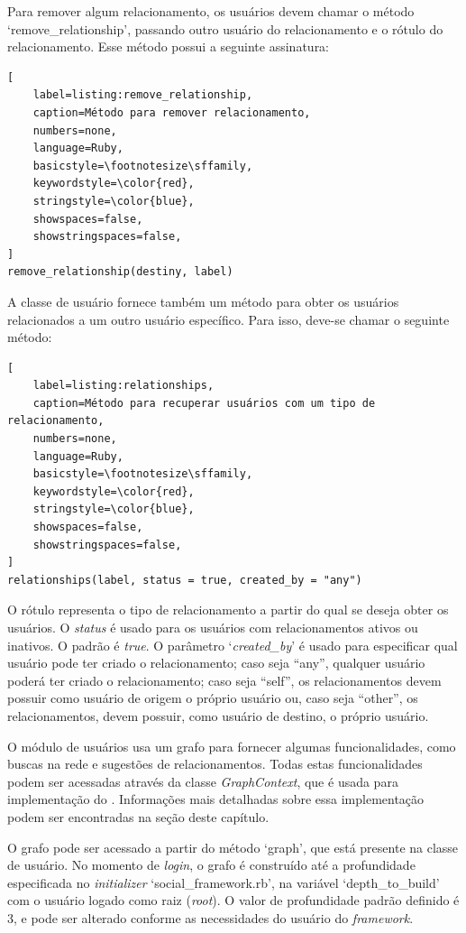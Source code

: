 Para remover algum relacionamento, os usuários devem chamar o método `remove\_relationship', passando outro usuário do relacionamento e o rótulo do relacionamento. Esse método possui a seguinte assinatura:

\begin{lstlisting}[
    label=listing:remove_relationship,
    caption=Método para remover relacionamento,
    numbers=none,
    language=Ruby,
    basicstyle=\footnotesize\sffamily,
    keywordstyle=\color{red},
    stringstyle=\color{blue},
    showspaces=false,
    showstringspaces=false,
]
remove_relationship(destiny, label)
\end{lstlisting}

A classe de usuário fornece também um método para obter os usuários relacionados a um outro usuário específico. Para isso, deve-se chamar o seguinte método:

\begin{lstlisting}[
    label=listing:relationships,
    caption=Método para recuperar usuários com um tipo de relacionamento,
    numbers=none,
    language=Ruby,
    basicstyle=\footnotesize\sffamily,
    keywordstyle=\color{red},
    stringstyle=\color{blue},
    showspaces=false,
    showstringspaces=false,
]
relationships(label, status = true, created_by = "any")
\end{lstlisting}

O rótulo representa o tipo de relacionamento a partir do qual se deseja obter os usuários. O \textit{status} é usado para os usuários com relacionamentos ativos ou inativos. O padrão é \textit{true}. O parâmetro `\textit{created\_by}' é usado para especificar qual usuário pode ter criado o relacionamento; caso seja ``any'', qualquer usuário poderá ter criado o relacionamento; caso seja ``self'', os relacionamentos devem possuir como usuário de origem o próprio usuário ou, caso seja ``other'', os relacionamentos, devem possuir, como usuário de destino, o próprio usuário.

O módulo de usuários usa um grafo para fornecer algumas funcionalidades, como buscas na rede e sugestões de relacionamentos. Todas estas funcionalidades podem ser acessadas através da classe \textit{GraphContext}, que é usada para implementação do . Informações mais detalhadas sobre essa implementação podem ser encontradas na seção  deste capítulo.

O grafo pode ser acessado a partir do método `graph', que está presente na classe de usuário. No momento de \textit{login}, o grafo é construído até a profundidade especificada no \textit{initializer} `social\_framework.rb', na variável `depth\_to\_build' com o usuário logado como raiz (\textit{root}). O valor de profundidade padrão definido é 3, e pode ser alterado conforme as necessidades do usuário do \textit{framework}.

